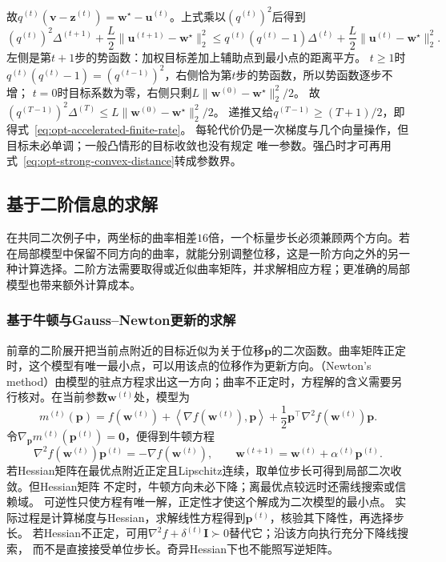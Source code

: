故$q^{(t)}(\bm v-\bm z^{(t)})=\bm w^\star-\bm u^{(t)}$。上式乘以$(q^{(t)})^2$后得到
\[
 (q^{(t)})^2\Delta^{(t+1)}+\frac L2\|\bm u^{(t+1)}-\bm w^\star\|_2^2
 \leq q^{(t)}(q^{(t)}-1)\Delta^{(t)}+\frac L2\|\bm u^{(t)}-\bm w^\star\|_2^2.
\]
左侧是第$t+1$步的势函数：加权目标差加上辅助点到最小点的距离平方。
$t\geq1$时$q^{(t)}(q^{(t)}-1)=(q^{(t-1)})^2$，右侧恰为第$t$步的势函数，所以势函数逐步不增；
$t=0$时目标系数为零，右侧只剩$L\|\bm w^{(0)}-\bm w^\star\|_2^2/2$。
故$(q^{(T-1)})^2\Delta^{(T)}\leq L\|\bm w^{(0)}-\bm w^\star\|_2^2/2$。
递推又给$q^{(T-1)}\geq(T+1)/2$，即得式~\eqref{eq:opt-accelerated-finite-rate}。
每轮代价仍是一次梯度与几个向量操作，但目标未必单调；一般凸情形的目标收敛也没有规定
唯一参数。强凸时才可再用式~\eqref{eq:opt-strong-convex-distance}转成参数界。

\subsection{基于二阶信息的求解}
\label{sec:opt-second-order-methods}

在共同二次例子中，两坐标的曲率相差$16$倍，一个标量步长必须兼顾两个方向。若在局部模型中保留不同方向的曲率，就能分别调整位移，这是一阶方向之外的另一种计算选择。二阶方法需要取得或近似曲率矩阵，并求解相应方程；更准确的局部模型也带来额外计算成本。

\subsubsection{基于牛顿与Gauss–Newton更新的求解}
\label{sec:opt-newton-gauss-newton}

前章的二阶展开把当前点附近的目标近似为关于位移$\bm p$的二次函数。曲率矩阵正定时，这个模型有唯一最小点，可以用该点的位移作为更新方向。（Newton's method）由模型的驻点方程求出这一方向；曲率不正定时，方程解的含义需要另行核对。在当前参数$\bm w^{(t)}$处，模型为
\[
  m^{(t)}(\bm{p})
  =
  f(\bm{w}^{(t)})
  +\left\langle\nabla f(\bm{w}^{(t)}),\bm{p}\right\rangle
  +\frac12\bm{p}^{\top}\nabla^2f(\bm{w}^{(t)})\bm{p}.
\]
令$\nabla_{\bm{p}}m^{(t)}(\bm{p}^{(t)})=\bm{0}$，便得到牛顿方程
\[
  \nabla^2 f(\bm{w}^{(t)})\bm{p}^{(t)}
  =-\nabla f(\bm{w}^{(t)}),\qquad
  \bm{w}^{(t+1)}=\bm{w}^{(t)}+\alpha^{(t)}\bm{p}^{(t)}.
\]
若Hessian矩阵在最优点附近正定且Lipschitz连续，取单位步长可得到局部二次收敛。但Hessian矩阵
不定时，牛顿方向未必下降；离最优点较远时还需线搜索或信赖域。
可逆性只使方程有唯一解，正定性才使这个解成为二次模型的最小点。
实际过程是计算梯度与Hessian，求解线性方程得到$\bm p^{(t)}$，核验其下降性，再选择步长。
若Hessian不正定，可用$\nabla^2f+\delta^{(t)}\bm I\succ0$替代它；沿该方向执行充分下降线搜索，
而不是直接接受单位步长。奇异Hessian下也不能照写逆矩阵。

